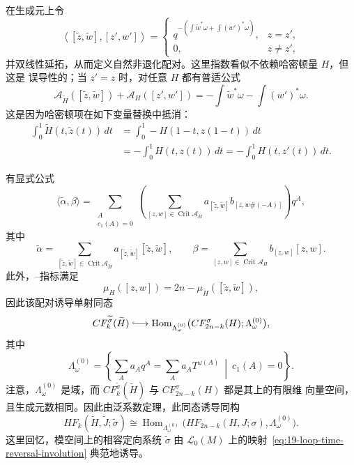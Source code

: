 在生成元上令
\[
 \left\langle[\widetilde z,\widetilde w],[z',w']\right\rangle
 =\begin{cases}
 q^{-\left(\int\widetilde w^*\omega+
 \int(w')^*\omega\right)},&z=z',\\
 0,&z\neq z',
 \end{cases}
\]
并双线性延拓，从而定义自然非退化配对。这里指数看似不依赖哈密顿量 $H$，但这是
误导性的；当 $z'=z$ 时，对任意 $H$ 都有普适公式
\begin{equation}
 \mathcal A_{\widetilde H}([\widetilde z,\widetilde w])
 +\mathcal A_H([z',w'])
 =-\int\widetilde w^*\omega-\int(w')^*\omega.
\label{eq:19-time-reversed-action-sum}
\end{equation}
这是因为哈密顿项在如下变量替换中抵消：
\[
\begin{aligned}
 \int_0^1\widetilde H(t,\widetilde z(t))\,dt
 &=\int_0^1-H(1-t,z(1-t))\,dt\\
 &=-\int_0^1H(t,z(t))\,dt
 =-\int_0^1H(t,z'(t))\,dt.
\end{aligned}
\]

有显式公式
\[
 \langle\widetilde\alpha,\beta\rangle
 =\sum_{\substack{A\\c_1(A)=0}}
 \left(\sum_{[z,w]\in\operatorname{Crit}\mathcal A_H}
 a_{[\widetilde z,\widetilde w]}
 b_{[z,w\#(-A)]}\right)q^A,
\]
其中
\[
 \widetilde\alpha
 =\sum_{[\widetilde z,\widetilde w]\in
 \operatorname{Crit}\mathcal A_{\widetilde H}}
 a_{[\widetilde z,\widetilde w]}[\widetilde z,\widetilde w],
 \qquad
 \beta=\sum_{[z,w]\in\operatorname{Crit}\mathcal A_H}b_{[z,w]}[z,w].
\]
此外，\personConley{}--\personZehnder{}指标满足
\[
 \mu_H([z,w])=2n-\mu_{\widetilde H}([\widetilde z,\widetilde w]),
\]
因此该配对诱导单射同态
\[
 CF_k^{\widetilde\sigma}(\widetilde H)
 \lhook\joinrel\longrightarrow
 \operatorname{Hom}_{\Lambda_\omega^{(0)}}
 \bigl(CF_{2n-k}^{\sigma}(H);\Lambda_\omega^{(0)}\bigr),
\]
其中
\[
 \Lambda_\omega^{(0)}=
 \left\{\sum_Aa_Aq^A=\sum_Aa_AT^{\omega(A)}\ \middle|\ c_1(A)=0\right\}.
\]
注意，$\Lambda_\omega^{(0)}$ 是域，而
$CF_k^{\widetilde\sigma}(\widetilde H)$ 与 $CF_{2n-k}^\sigma(H)$ 都是其上的有限维
向量空间，且生成元数相同。因此由泛系数定理，此同态诱导同构
\begin{equation}
 HF_k(\widetilde H,\widetilde J;\widetilde\sigma)
 \cong\operatorname{Hom}_{\Lambda_\omega^{(0)}}
 \bigl(HF_{2n-k}(H,J;\sigma),\Lambda_\omega^{(0)}\bigr).
\label{eq:19-floer-time-reversal-dual-isomorphism}
\end{equation}
这里回忆，\personFloer{}模空间上的相容定向系统 $\widetilde\sigma$ 由
$\mathcal L_0(M)$ 上的映射~\eqref{eq:19-loop-time-reversal-involution} 典范地诱导。

